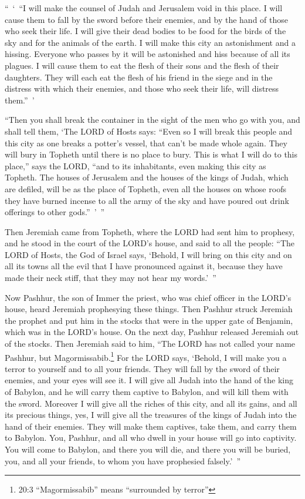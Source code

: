 \myverse{}“ ‘ “I will make the counsel of Judah and Jerusalem void in this place. I will cause them to fall by the sword before their enemies, and by the hand of those who seek their life. I will give their dead bodies to be food for the birds of the sky and for the animals of the earth. \myverse{}I will make this city an astonishment and a hissing. Everyone who passes by it will be astonished and hiss because of all its plagues. \myverse{}I will cause them to eat the flesh of their sons and the flesh of their daughters. They will each eat the flesh of his friend in the siege and in the distress with which their enemies, and those who seek their life, will distress them.” ’


\myverse{}“Then you shall break the container in the sight of the men who go with you, \myverse{}and shall tell them, ‘The LORD of Hosts says: “Even so I will break this people and this city as one breaks a potter’s vessel, that can’t be made whole again. They will bury in Topheth until there is no place to bury. \myverse{}This is what I will do to this place,” says the LORD, “and to its inhabitants, even making this city as Topheth. \myverse{}The houses of Jerusalem and the houses of the kings of Judah, which are defiled, will be as the place of Topheth, even all the houses on whose roofs they have burned incense to all the army of the sky and have poured out drink offerings to other gods.” ’ ”


\myverse{}Then Jeremiah came from Topheth, where the LORD had sent him to prophesy, and he stood in the court of the LORD’s house, and said to all the people: \myverse{}“The LORD of Hosts, the God of Israel says, ‘Behold, I will bring on this city and on all its towns all the evil that I have pronounced against it, because they have made their neck stiff, that they may not hear my words.’ ”


\mychapter{} \myverse*{}Now Pashhur, the son of Immer the priest, who was chief officer in the LORD’s house, heard Jeremiah prophesying these things. \myverse{}Then Pashhur struck Jeremiah the prophet and put him in the stocks that were in the upper gate of Benjamin, which was in the LORD’s house. \myverse{}On the next day, Pashhur released Jeremiah out of the stocks. Then Jeremiah said to him, “The LORD has not called your name Pashhur, but Magormissabib.\footnote{20:3 “Magormissabib” means “surrounded by terror”} \myverse{}For the LORD says, ‘Behold, I will make you a terror to yourself and to all your friends. They will fall by the sword of their enemies, and your eyes will see it. I will give all Judah into the hand of the king of Babylon, and he will carry them captive to Babylon, and will kill them with the sword. \myverse{}Moreover I will give all the riches of this city, and all its gains, and all its precious things, yes, I will give all the treasures of the kings of Judah into the hand of their enemies. They will make them captives, take them, and carry them to Babylon. \myverse{}You, Pashhur, and all who dwell in your house will go into captivity. You will come to Babylon, and there you will die, and there you will be buried, you, and all your friends, to whom you have prophesied falsely.’ ”

